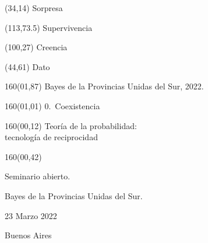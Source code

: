 \documentclass[shownotes,aspectratio=169]{beamer}
\begin{document}
\color{black!85}
\large

 

\begin{frame}
\begin{textblock}{80}(34,14)
 \huge \textcolor{black!50}{Sorpresa}
\end{textblock}

\begin{textblock}{47}(113,73.5)
\centering \LARGE  \textcolor{black!5}{Supervivencia}
\end{textblock}

\begin{textblock}{80}(100,27)
\LARGE  \textcolor{black!10}{Creencia}
\end{textblock}

\begin{textblock}{80}(44,61)
\LARGE  \textcolor{black!15}{Dato}
\end{textblock}

\begin{textblock}{160}(01,87)
\scriptsize \textcolor{black!5}{Bayes de la Provincias Unidas del Sur, 2022.}
\end{textblock}

\begin{textblock}{160}(01,01)
\normalsize \textcolor{black!60}{0.\ Coexistencia}
\end{textblock}

{}
\end{frame}

\begin{frame}
\begin{textblock}{160}(00,12)
\centering
\huge Teoría de la probabilidad: \\ tecnología de reciprocidad
\end{textblock}

\begin{textblock}{160}(00,42) \centering

Seminario abierto.

Bayes de la Provincias Unidas del Sur.


\vspace{1.5cm}

23 Marzo 2022

\vspace{.3cm}

Buenos Aires
\end{textblock}



\end{frame}
\end{document}
